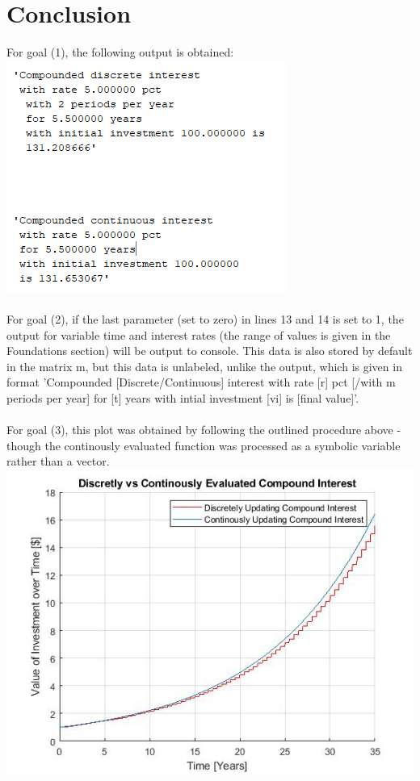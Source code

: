 \documentclass[10pt]{report}
\begin{document}
    \section*{Conclusion}
    For goal (1), the following output is obtained:
    \includegraphics[width=\textwidth]{capture.PNG}\\\\
    For goal (2), if the last parameter (set to zero) in lines 13 and 14 is set to 1, the output for variable time and interest rates   (the range of values is given in the Foundations section) will be output to console. This data is also stored by default in the matrix m, but this data is unlabeled, unlike the output, which is given in format 'Compounded [Discrete/Continuous] interest with rate [r] pct [/with m periods per year] for [t] years with intial investment [vi] is  [final value]'. \\\\
    For goal (3), this plot was obtained by following the outlined procedure above - though the continously evaluated function was processed as a symbolic variable rather than a vector. 
    \includegraphics[width=\textwidth]{graph_final_2d.jpg}
\end{document}
